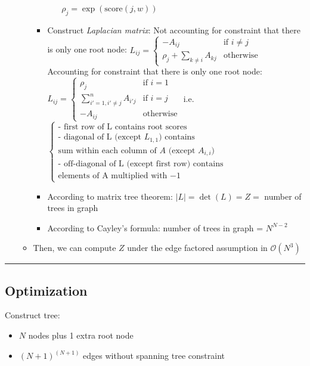 \begin{itemize}
\begin{itemize}
\begin{itemize}
\begin{itemize}
                $
                \rho_j = \exp(\textrm{score}(j, w))
                $
            \end{itemize}
            \item Construct \emph{Laplacian matrix}:
            Not accounting for constraint that there is only one root node:
            $L_{ij} =
            \begin{cases}
                -A_{ij} & \text{if } i \neq j \\
                \rho_j + \sum_{k \neq i} A_{kj} & \text{otherwise}
            \end{cases}$\\
            Accounting for constraint that there is only one root node:
            $L_{ij} =
            \begin{cases}
                \rho_j & \text{if } i = 1 \\
                \sum_{i'=1,i' \neq j}^n A_{i'j} & \text{if } i = j \\
                -A_{ij} & \text{otherwise}
            \end{cases}$
            i.e. 
            $\begin{cases}
                \text{- first row of L contains root scores} \\
                \text{- diagonal of L (except } L_{1,1} \text{) contains}\\
                \text{sum within each column of } A \text{ (except } A_{i,i} \text{)}\\
                \text{- off-diagonal of L (except first row) contains}\\ \text{elements of A multiplied with $-1$ }
            \end{cases}$
            \item According to matrix tree theorem: $|L| = \det(L) = Z =$ number of trees in graph
            \item According to Cayley's formula: number of trees in graph = $N^{N-2}$
        \end{itemize}
        \item Then, we can compute $Z$ under the edge factored assumption in $\mathcal{O}(N^3)$
    \end{itemize}
\end{itemize}

{\color{black}\hrule height 0.001mm}

\subsection*{Optimization}
Construct tree:
\begin{itemize}
    \item $N$ nodes plus 1 extra root node
    \item $(N+1)^{(N+1)}$ edges without spanning tree constraint
\end{itemize}

